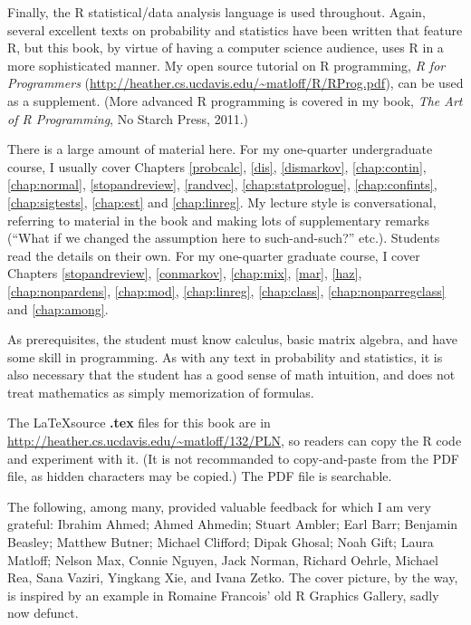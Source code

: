 Finally, the R statistical/data analysis language is used
throughout.  Again, several excellent texts on probability and
statistics have been written that feature R, but this book, by virtue of
having a computer science audience, uses R in a more sophisticated
manner.  My open source tutorial on R programming, {\it R for
Programmers} (\url{http://heather.cs.ucdavis.edu/~matloff/R/RProg.pdf}),
can be used as a supplement.  (More advanced R programming is covered in
my book, {\it The Art of R Programming}, No Starch Press, 2011.)

There is a large amount of material here.  For my one-quarter
undergraduate course, I usually cover Chapters 
\ref{probcalc},
\ref{dis},
\ref{dismarkov},
\ref{chap:contin},
\ref{chap:normal},
\ref{stopandreview},
\ref{randvec},
\ref{chap:statprologue},
\ref{chap:confints},
\ref{chap:sigtests},
\ref{chap:est} and
\ref{chap:linreg}.  
My lecture style is conversational, referring to
material in the book and making lots of supplementary remarks (``What if
we changed the assumption here to such-and-such?'' etc.).  Students read
the details on their own.  For my one-quarter graduate course, I cover
Chapters
\ref{stopandreview},
\ref{conmarkov},
\ref{chap:mix},
\ref{mar},
\ref{haz},
\ref{chap:nonpardens},
\ref{chap:mod},
\ref{chap:linreg},  
\ref{chap:class},  
\ref{chap:nonparregclass} and 
\ref{chap:among}.  

As prerequisites, the student must know calculus, basic matrix algebra, and
have some skill in programming.  As with any text in probability and
statistics, it is also necessary that the student has a good sense
of math intuition, and does not treat mathematics as simply memorization
of formulas.

The \LaTeX source {\bf .tex} files for this book are in
\url{http://heather.cs.ucdavis.edu/~matloff/132/PLN}, so readers can
copy the R code and experiment with it.  (It is not recommanded to
copy-and-paste from the PDF file, as hidden characters may be copied.)
The PDF file is searchable.

The following, among many, provided valuable feedback for which I am
very grateful:  Ibrahim Ahmed; Ahmed Ahmedin; Stuart Ambler; Earl Barr;
Benjamin Beasley; Matthew Butner; Michael Clifford; Dipak Ghosal; Noah
Gift; Laura Matloff; Nelson Max, Connie Nguyen, Jack Norman, Richard
Oehrle, Michael Rea, Sana Vaziri, Yingkang Xie, and Ivana Zetko.  The
cover picture, by the way, is inspired by an example in Romaine
Francois' old R Graphics Gallery, sadly now defunct.

